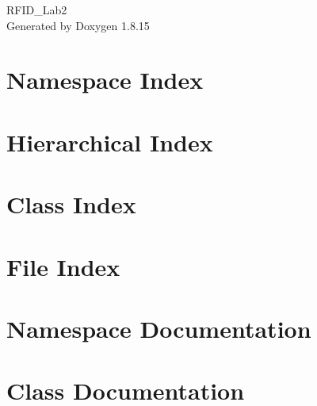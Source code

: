 \let\mypdfximage\pdfximage\def\pdfximage{\immediate\mypdfximage}\documentclass[twoside]{book}
\newcommand{\+}{\discretionary{\mbox{\scriptsize$\hookleftarrow$}}{}{}}
\newcommand{\clearemptydoublepage}{%
  \newpage{\pagestyle{empty}\cleardoublepage}%
}
\begin{document}
\hypersetup{pageanchor=false,
             bookmarksnumbered=true,
             pdfencoding=unicode
            }
\begin{titlepage}
\vspace*{7cm}
\begin{center}%
{\Large R\+F\+I\+D\+\_\+\+Lab2 }\\
\vspace*{1cm}
{\large Generated by Doxygen 1.8.15}\\
\end{center}
\end{titlepage}
\clearemptydoublepage
{}
\tableofcontents
\clearemptydoublepage
{}
\hypersetup{pageanchor=true}

\chapter{Namespace Index}

\chapter{Hierarchical Index}

\chapter{Class Index}

\chapter{File Index}

\chapter{Namespace Documentation}

\chapter{Class Documentation}





























\end{document}
